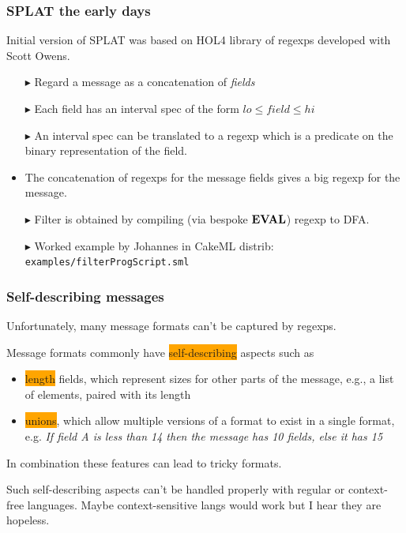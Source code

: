\documentclass{beamer}
\newcommand{\kemph}[1]{\colorbox{orange}{#1}}
\newcommand{\konst}[1]{\ensuremath{\mbox{\bf{#1}}}}
\begin{document}
\begin{frame}[fragile]\frametitle{SPLAT the early days}

Initial version of SPLAT was based on HOL4 library of regexps developed with Scott Owens.

\begin{itemize}[<+->]
\item [$\blacktriangleright$] Regard a message as a concatenation of \emph{fields}
\item [$\blacktriangleright$] Each field has an interval spec of the form $\mathit{lo} \leq \mathit{field} \leq \mathit{hi}$
\item [$\blacktriangleright$] An interval spec can be translated to a regexp which is a
  predicate on the binary representation of the field.
\item The concatenation of regexps for the message fields gives a big regexp for the message.
\item [$\blacktriangleright$] Filter is obtained by compiling (via bespoke \konst{EVAL}) regexp to DFA.
\item [$\blacktriangleright$] Worked example by Johannes in CakeML distrib: \verb+examples/filterProgScript.sml+
\end{itemize}

\end{frame}

\begin{frame}[fragile]\frametitle{Self-describing messages}

Unfortunately, many message formats can't be captured by regexps.

Message formats commonly have \kemph{self-describing} aspects such as

\begin{itemize}
\item \kemph{length} fields, which represent sizes for other parts of the message, e.g., a list of elements, paired with its length
\item \kemph{unions}, which allow multiple versions of a format to exist in a single format, e.g.
  \textit{If field A is less than 14 then the message has 10 fields, else it has 15}
\end{itemize}

In combination these features can lead to tricky formats.

Such self-describing aspects can't be handled properly with regular or context-free languages. Maybe context-sensitive langs would work but I hear they are hopeless.


\end{frame}
\end{document}

